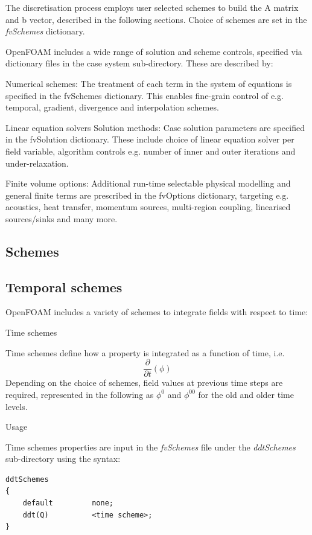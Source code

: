 \documentclass{article}
\begin{document}
The discretisation process employs user selected schemes to build the A matrix and b vector, described in the following sections. Choice of schemes are set in the \textit{fvSchemes} dictionary.

OpenFOAM includes a wide range of solution and scheme controls, specified via dictionary files in the case system sub-directory. These are described by:

Numerical schemes: The treatment of each term in the system of equations is specified in the fvSchemes dictionary. This enables fine-grain control of e.g. temporal, gradient, divergence and interpolation schemes.

Linear equation solvers Solution methods: Case solution parameters are specified in the fvSolution dictionary. These include choice of linear equation solver per field variable, algorithm controls e.g. number of inner and outer iterations and under-relaxation.

Finite volume options: Additional run-time selectable physical modelling and general finite terms are prescribed in the fvOptions dictionary, targeting e.g. acoustics, heat transfer, momentum sources, multi-region coupling, linearised sources/sinks and many more.

\subsection{Schemes}

\subsection{Temporal schemes}

OpenFOAM includes a variety of schemes to integrate fields with respect to time:

Time schemes

Time schemes define how a property is integrated as a function of time, i.e.
\begin{equation}
\frac{\partial}{\partial t}(\phi)
\end{equation}
Depending on the choice of schemes, field values at previous time steps are required, represented in the following as $\phi^0$ and $\phi^{00}$ for the old and older time levels. 

Usage 

Time schemes properties are input in the \textit{fvSchemes} file under the \textit{ddtSchemes} sub-directory using the syntax:

\begin{verbatim}
ddtSchemes
{
    default         none;
    ddt(Q)          <time scheme>;
}
\end{verbatim}
 
\end{document}
